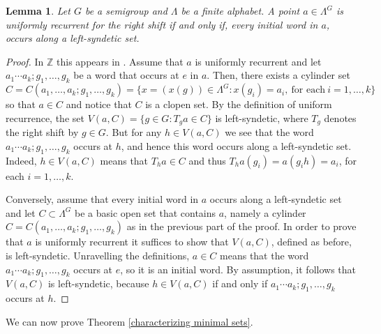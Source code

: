 \documentclass{amsart}
\numberwithin{equation}{section}
\newtheorem{lemma}{Lemma}[section]
\theoremstyle{definition}
\theoremstyle{plain}
\newcommand{\Z}{{\mathbb Z}}
\begin{document}
\begin{lemma}\label{uniformly recurrent symbolic points}
Let $G$ be a semigroup and $\Lambda$ be a finite alphabet. A point $a\in \Lambda^{G}$ is uniformly recurrent for the right shift if and only if, every initial word in $a$, occurs along a left-syndetic set.   
\end{lemma}

\begin{proof}
In $\Z$ this appears in \cite[Proposition 1.22]{Fur_book}. Assume that $a$ is 
uniformly recurrent and let $a_1\cdots a_k;g_1,\dots, g_k$ be a word that 
occurs at $e$ in $a$. 
Then, there exists a cylinder set 
$$C=C(a_1,\ldots,a_k;g_1,\ldots,g_k)=\{x=(x(g))\in \Lambda^G: x(g_i)=a_i,\ 
\text{for each}\ i=1,\ldots,k\}$$
so that $a\in C$ and notice that $C$ is a clopen set. By the definition of 
uniform recurrence, the set $V(a,C)=\{g\in G: T_ga\in C\}$ is left-syndetic, 
where $T_g$ denotes the right shift by $g\in G$. But for 
any $h\in V(a,C)$ 
we see that the word $a_1\cdots a_k; g_1,\dots, g_k$ 
occurs at $h$, and hence this word occurs along a 
left-syndetic set. Indeed, $h\in V(a,C)$ means that 
$T_ha\in C$ and thus $T_ha(g_i)=a(g_ih)=a_i$, for each $i=1,\ldots,k$.

Conversely, assume that every initial word in $a$ occurs along a left-syndetic set and let $C\subset \Lambda^{G}$ be a basic open set that 
contains $a$, namely a cylinder $C=C(a_1,\ldots,a_k;g_1,\ldots,g_k)$ as in the previous part of the proof. In order to prove that $a$ is uniformly recurrent it suffices to 
show that $V(a,C)$, defined as before, is left-syndetic. Unravelling the 
definitions, $a\in C$ means that the word 
$a_1\cdots a_k;g_1,\dots, g_k$ occurs at $e$, so it is an initial word. By assumption, it follows that $V(a,C)$ is left-syndetic, because 
$h\in V(a,C)$ if and only if $a_1\cdots a_k;g_1,\dots, g_k$ occurs at $h$.
\end{proof}

We can now prove Theorem \ref{characterizing minimal sets}.
\end{document}
